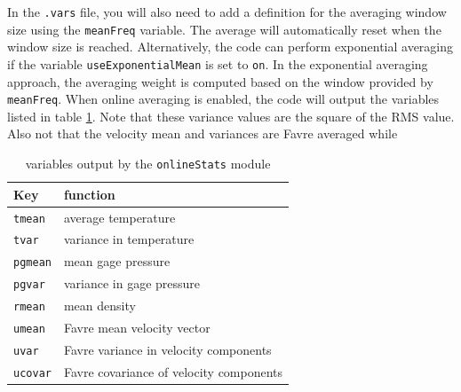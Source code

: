\documentclass{article}
\begin{document}
In the {\tt .vars} file, you will also need to add a definition for
the averaging window size using the {\tt meanFreq} variable.  The
average will automatically reset when the window size is reached.
Alternatively, the code can perform exponential averaging if the
variable {\tt useExponentialMean} is set to {\tt on}.  In the
exponential averaging approach, the averaging weight is computed based
on the window provided by {\tt meanFreq}.  When online averaging is
enabled, the code will output the variables listed in table
\ref{tab:onlinestats}.  Note that these variance values are the square
of the RMS value.  Also not that the velocity mean and variances are
Favre averaged while

\begin{table}[htbp]
  \begin{center}
    
    \leavevmode
    \begin{tabular}{|l|l|}
      \hline
      Key & function \\
      \hline
      {\tt tmean} & average temperature \\
      {\tt tvar} & variance in temperature \\
      {\tt pgmean} & mean gage pressure \\
      {\tt pgvar} & variance in gage pressure\\
      {\tt rmean} & mean density\\
      {\tt umean} & Favre mean velocity vector\\
      {\tt uvar} & Favre variance in velocity components\\
      {\tt ucovar} & Favre covariance of velocity components\\
      \hline
    \end{tabular}
    
    \caption{variables output by the {\tt onlineStats} module}
    \label{tab:onlinestats}
  \end{center}
\end{table}






\end{document}
